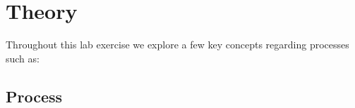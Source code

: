 
\section{Theory}\label{sec:theory}
    Throughout this lab exercise we explore a few key concepts regarding processes such as:

    \subsection{Process}\label{subsec:process}
        \lipsum[1]
